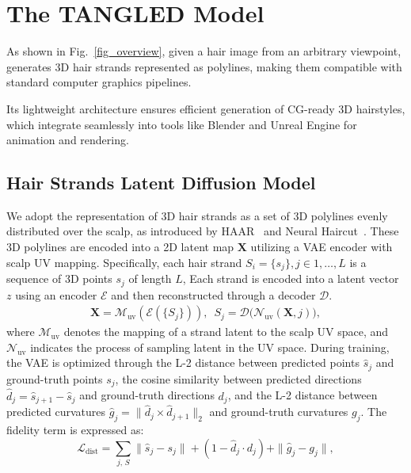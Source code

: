 
\section{The TANGLED Model}
\label{sec:method}


As shown in Fig.~\ref{fig_overview}, given a hair image from an arbitrary viewpoint, \myname 
generates 3D hair strands represented as polylines, making them compatible with standard computer graphics pipelines.

Its lightweight architecture ensures efficient generation of CG-ready 3D hairstyles, which integrate seamlessly into tools like Blender and Unreal Engine for animation and rendering.



\subsection{Hair Strands Latent Diffusion Model}



We adopt the representation of 3D hair strands as a set of 3D polylines evenly distributed over the scalp, as introduced by HAAR~\cite{HAAR:CVPR:2024} and Neural Haircut~\cite{sklyarova2023neural}. These 3D polylines are encoded into a 2D latent map $\mathbf{X}$ utilizing a VAE encoder with scalp UV mapping. 
Specifically, each hair strand $S_i = \{s_j\}, {j \in 1, \dots, L}$ is a sequence of 3D points $s_j$ of length $L$, Each strand is encoded into a latent vector $z$ using an encoder $\mathcal{E}$ and then reconstructed through a decoder $\mathcal{D}$. 
%
\begin{align}
\mathbf{X} =  \mathcal{M}_\text{uv} (\mathcal{E}(\{ S_j \})), \, \, \, 
S_j = \mathcal{D} \big (  \mathcal{N}_\text{uv} ( \mathbf{X}, j) \big ),
\end{align}    
%
where $\mathcal{M}_\text{uv}$ denotes the mapping of a strand latent to the scalp UV space, and $\mathcal{N}_\text{uv}$ indicates the process of sampling latent in the UV space.
During training, the VAE is optimized through the L-2 distance between predicted points $\hat{s}_j$ and ground-truth points $s_j$, the cosine similarity between predicted directions $\hat{d}_j = \hat{s}_{j + 1} - \hat{s}_{j}$ and ground-truth directions $d_j$, and the L-2 distance between predicted curvatures $\hat{g}_j = \|\hat{d}_j \times \hat{d}_{j+1}\|_2$ and ground-truth curvatures $g_j$. The fidelity term is expressed as:
\begin{equation}    
\mathcal{L}_{\text{dist}} = \sum_{j, \, S} \|\hat{s}_j - s_j\| + (1 - \hat{d}_j \cdot d_j) + \|\hat{g}_j - g_j\|,
\end{equation}

